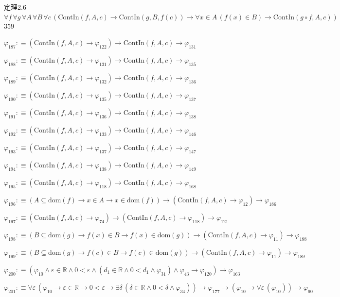 \begin{fullproof}{定理2.6}{$\forall f\,\forall g\,\forall A\,\forall B\,\forall c\,(\mathrm{ContIn}(f,A,c) \to \mathrm{ContIn}(g,B,f(c)) \to \forall x \in A\,(f(x) \in B) \to \mathrm{ContIn}(g \circ f,A,c))$}{359}
\begin{abbrevlist}
\item $\varphi_{187} :\equiv (\mathrm{ContIn}(f,A,c) \to \varphi_{122}) \to \mathrm{ContIn}(f,A,c) \to \varphi_{131}$
\item $\varphi_{188} :\equiv (\mathrm{ContIn}(f,A,c) \to \varphi_{131}) \to \mathrm{ContIn}(f,A,c) \to \varphi_{135}$
\item $\varphi_{189} :\equiv (\mathrm{ContIn}(f,A,c) \to \varphi_{132}) \to \mathrm{ContIn}(f,A,c) \to \varphi_{136}$
\item $\varphi_{190} :\equiv (\mathrm{ContIn}(f,A,c) \to \varphi_{135}) \to \mathrm{ContIn}(f,A,c) \to \varphi_{137}$
\item $\varphi_{191} :\equiv (\mathrm{ContIn}(f,A,c) \to \varphi_{136}) \to \mathrm{ContIn}(f,A,c) \to \varphi_{138}$
\item $\varphi_{192} :\equiv (\mathrm{ContIn}(f,A,c) \to \varphi_{133}) \to \mathrm{ContIn}(f,A,c) \to \varphi_{146}$
\item $\varphi_{193} :\equiv (\mathrm{ContIn}(f,A,c) \to \varphi_{137}) \to \mathrm{ContIn}(f,A,c) \to \varphi_{147}$
\item $\varphi_{194} :\equiv (\mathrm{ContIn}(f,A,c) \to \varphi_{138}) \to \mathrm{ContIn}(f,A,c) \to \varphi_{149}$
\item $\varphi_{195} :\equiv (\mathrm{ContIn}(f,A,c) \to \varphi_{118}) \to \mathrm{ContIn}(f,A,c) \to \varphi_{168}$
\item $\varphi_{196} :\equiv (A \subseteq \mathrm{dom}(f) \to x \in A \to x \in \mathrm{dom}(f)) \to (\mathrm{ContIn}(f,A,c) \to \varphi_{12}) \to \varphi_{186}$
\item $\varphi_{197} :\equiv (\mathrm{ContIn}(f,A,c) \to \varphi_{74}) \to (\mathrm{ContIn}(f,A,c) \to \varphi_{118}) \to \varphi_{121}$
\item $\varphi_{198} :\equiv (B \subseteq \mathrm{dom}(g) \to f(x) \in B \to f(x) \in \mathrm{dom}(g)) \to (\mathrm{ContIn}(f,A,c) \to \varphi_{11}) \to \varphi_{188}$
\item $\varphi_{199} :\equiv (B \subseteq \mathrm{dom}(g) \to f(c) \in B \to f(c) \in \mathrm{dom}(g)) \to (\mathrm{ContIn}(f,A,c) \to \varphi_{11}) \to \varphi_{189}$
\item $\varphi_{200} :\equiv (\varphi_{10} \land \varepsilon \in \mathbb{R} \land 0 < \varepsilon \land (d_{1} \in \mathbb{R} \land 0 < d_{1} \land \varphi_{31}) \land \varphi_{43} \to \varphi_{120}) \to \varphi_{163}$
\item $\varphi_{201} :\equiv \forall \varepsilon\,(\varphi_{10} \to \varepsilon \in \mathbb{R} \to 0 < \varepsilon \to \exists \delta\,(\delta \in \mathbb{R} \land 0 < \delta \land \varphi_{34})) \to \varphi_{177} \to (\varphi_{10} \to \forall \varepsilon\,(\varphi_{10})) \to \varphi_{90}$

\end{abbrevlist}
\end{fullproof}
